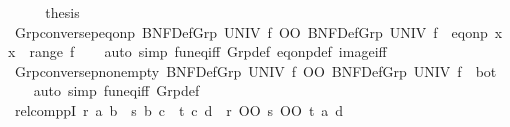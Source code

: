 \begin{isabellebody}
\ \ \isamarkupfalse%
\ \isamarkupfalse%
\ {\isacharquery}{\kern0pt}thesis\ \isacommand{{\isachardot}{\kern0pt}}\isamarkupfalse%
\isanewline
{}\isamarkupfalse%
%
\endisatagproof
{\isafoldproof}%
%
\isadelimproof
\isanewline
%
\endisadelimproof
\isanewline
{}\isamarkupfalse%
\ Grp{\isacharunderscore}{\kern0pt}conversep{\isacharunderscore}{\kern0pt}eq{\isacharunderscore}{\kern0pt}onp{\isacharcolon}{\kern0pt}\ {\isachardoublequoteopen}{\isacharparenleft}{\kern0pt}{\isacharparenleft}{\kern0pt}BNF{\isacharunderscore}{\kern0pt}Def{\isachardot}{\kern0pt}Grp\ UNIV\ f{\isacharparenright}{\kern0pt}{\isasyminverse}{\isasyminverse}\ OO\ BNF{\isacharunderscore}{\kern0pt}Def{\isachardot}{\kern0pt}Grp\ UNIV\ f{\isacharparenright}{\kern0pt}\ {\isacharequal}{\kern0pt}\ eq{\isacharunderscore}{\kern0pt}onp\ {\isacharparenleft}{\kern0pt}{\isasymlambda}x{\isachardot}{\kern0pt}\ x\ {\isasymin}\ range\ f{\isacharparenright}{\kern0pt}{\isachardoublequoteclose}\isanewline
%
\isadelimproof
\ \ %
\endisadelimproof
%
\isatagproof
{}\isamarkupfalse%
\ {\isacharparenleft}{\kern0pt}auto\ simp{\isacharcolon}{\kern0pt}\ fun{\isacharunderscore}{\kern0pt}eq{\isacharunderscore}{\kern0pt}iff\ Grp{\isacharunderscore}{\kern0pt}def\ eq{\isacharunderscore}{\kern0pt}onp{\isacharunderscore}{\kern0pt}def\ image{\isacharunderscore}{\kern0pt}iff{\isacharparenright}{\kern0pt}%
\endisatagproof
{\isafoldproof}%
%
\isadelimproof
\isanewline
%
\endisadelimproof
\isanewline
{}\isamarkupfalse%
\ Grp{\isacharunderscore}{\kern0pt}conversep{\isacharunderscore}{\kern0pt}nonempty{\isacharcolon}{\kern0pt}\ {\isachardoublequoteopen}{\isacharparenleft}{\kern0pt}BNF{\isacharunderscore}{\kern0pt}Def{\isachardot}{\kern0pt}Grp\ UNIV\ f{\isacharparenright}{\kern0pt}{\isasyminverse}{\isasyminverse}\ OO\ BNF{\isacharunderscore}{\kern0pt}Def{\isachardot}{\kern0pt}Grp\ UNIV\ f\ {\isasymnoteq}\ bot{\isachardoublequoteclose}\isanewline
%
\isadelimproof
\ \ %
\endisadelimproof
%
\isatagproof
{}\isamarkupfalse%
\ {\isacharparenleft}{\kern0pt}auto\ simp{\isacharcolon}{\kern0pt}\ fun{\isacharunderscore}{\kern0pt}eq{\isacharunderscore}{\kern0pt}iff\ Grp{\isacharunderscore}{\kern0pt}def{\isacharparenright}{\kern0pt}%
\endisatagproof
{\isafoldproof}%
%
\isadelimproof
\isanewline
%
\endisadelimproof
\isanewline
{}\isamarkupfalse%
\ relcomppI{}{\isacharcolon}{\kern0pt}\ {\isachardoublequoteopen}r\ a\ b\ {\isasymLongrightarrow}\ s\ b\ c\ {\isasymLongrightarrow}\ t\ c\ d\ {\isasymLongrightarrow}\ {\isacharparenleft}{\kern0pt}r\ OO\ s\ OO\ t{\isacharparenright}{\kern0pt}\ a\ d{\isachardoublequoteclose}\isanewline

\end{isabellebody}
